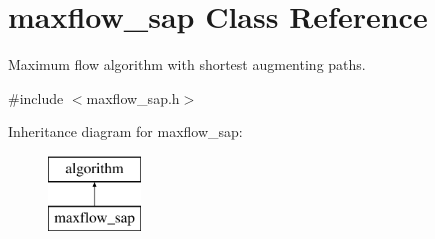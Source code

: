 \hypertarget{classmaxflow__sap}{}\section{maxflow\+\_\+sap Class Reference}
\label{classmaxflow__sap}


Maximum flow algorithm with shortest augmenting paths.  




{\ttfamily \#include $<$maxflow\+\_\+sap.\+h$>$}

Inheritance diagram for maxflow\+\_\+sap\+:\begin{figure}[H]
\begin{center}
\leavevmode
\includegraphics[height=2.000000cm]{classmaxflow__sap}
\end{center}
\end{figure}
